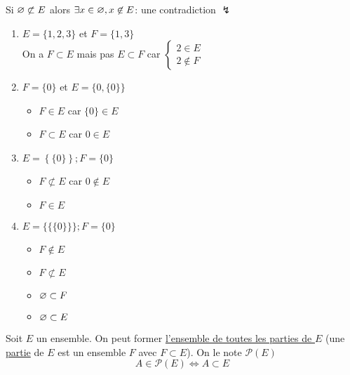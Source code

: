\begin{prv}
	Si $\varnothing \not\subset E$ alors $\exists x \in \varnothing, x \not\in E$: une contradiction $\lightning$ \\
\end{prv}

\begin{exm}
	\begin{enumerate}
		\item $E = \{1,2,3\}$ et $F = \{1,3\}$ \\
			On a $F \subset E$ mais pas $E \subset F$ car $\begin{cases}
				2 \in E\\
				2\not\in F
			\end{cases}$ 
		\item $F = \{0\}$ et $E = \{0, \{0\} \}$ \\
			\begin{itemize}
				\item  $F \in E$ car $\{0\} \in E$ 
				\item $F \subset  E$ car $0 \in E$
			\end{itemize}
		\item $E = \left\{ \{0\}  \right\}; F = \{0\}$ 
			\begin{itemize}
				\item $F \not\subset E$ car $0 \not\in E$
				\item $F \in E$
			\end{itemize}
		\item $E = \{\{\{0\} \} \}; F = \{0\}$ 
			\begin{itemize}
				\item $F\not\in E$
				\item $F\not\subset E$ 
				\item $\varnothing \subset F$ 
				\item $\varnothing\subset E$
			\end{itemize}
	\end{enumerate}
\end{exm}

\begin{defn}
	Soit $E$ un ensemble. On peut former \underline{l'ensemble de toutes les parties de $E$}
	(une \underline{partie} de $E$ est un ensemble $F$ avec $F\subset E$). On le note $\mathcal{P}(E)$\\
	\[
		A \in \mathcal{P}(E) \iff A \subset E
	\]
\end{defn}

